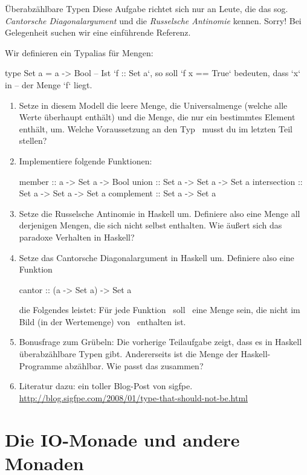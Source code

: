 \documentclass{uebblatt}
\begin{document}
\begin{aufgabe}{Überabzählbare Typen}
Diese Aufgabe richtet sich nur an Leute, die das sog. \emph{Cantorsche
Diagonalargument} und die \emph{Russelsche Antinomie} kennen. Sorry! Bei
Gelegenheit suchen wir eine einführende Referenz.

Wir definieren ein Typalias für Mengen:
\begin{haskellcode}
type Set a = a -> Bool
-- Ist `f :: Set a`, so soll `f x == True` bedeuten, dass `x` in
-- der Menge `f` liegt.
\end{haskellcode}
\begin{enumerate}
\item Setze in diesem Modell die leere Menge, die Universalmenge (welche alle
Werte überhaupt enthält) und die Menge, die nur ein bestimmtes Element enthält,
um. Welche Voraussetzung an den Typ~ musst du im letzten Teil
stellen?
\item Implementiere folgende Funktionen:
\begin{haskellcode}
member       :: a     -> Set a -> Bool
union        :: Set a -> Set a -> Set a
intersection :: Set a -> Set a -> Set a
complement   :: Set a -> Set a
\end{haskellcode}
\item Setze die Russelsche Antinomie in Haskell um. Definiere also eine Menge
all derjenigen Mengen, die sich nicht selbst enthalten. Wie äußert sich das
paradoxe Verhalten in Haskell?
\item Setze das Cantorsche Diagonalargument in Haskell um. Definiere also eine
Funktion
\begin{haskellcode}
cantor :: (a -> Set a) -> Set a
\end{haskellcode}
die Folgendes leistet: Für jede Funktion~
soll~ eine Menge sein, die nicht im Bild (in der
Wertemenge) von~ enthalten ist.
\item Bonusfrage zum Grübeln: Die vorherige Teilaufgabe zeigt, dass es in
Haskell überabzählbare Typen gibt. Andererseits ist die Menge der
Haskell-Programme abzählbar. Wie passt das zusammen?
\item Literatur dazu: ein toller Blog-Post von sigfpe.
\url{http://blog.sigfpe.com/2008/01/type-that-should-not-be.html}
\end{enumerate}
\end{aufgabe}


\section{Die IO-Monade und andere Monaden}
\end{document}
